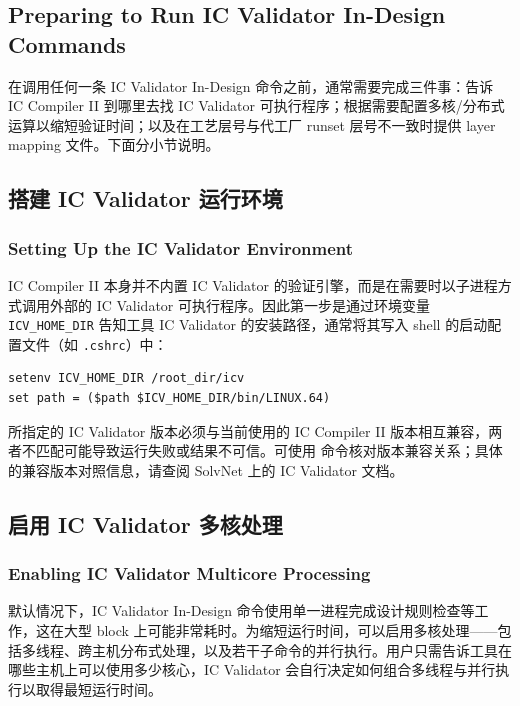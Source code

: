 \subsection*{Preparing to Run IC Validator In-Design Commands}

在调用任何一条 IC Validator In-Design 命令之前，通常需要完成三件事：告诉 IC Compiler II 到哪里去找 IC Validator 可执行程序；根据需要配置多核/分布式运算以缩短验证时间；以及在工艺层号与代工厂 runset 层号不一致时提供 layer mapping 文件。下面分小节说明。

\subsection{搭建 IC Validator 运行环境}
\subsubsection*{Setting Up the IC Validator Environment}

IC Compiler II 本身并不内置 IC Validator 的验证引擎，而是在需要时以子进程方式调用外部的 IC Validator 可执行程序。因此第一步是通过环境变量 \texttt{ICV\_HOME\_DIR} 告知工具 IC Validator 的安装路径，通常将其写入 shell 的启动配置文件（如 \texttt{.cshrc}）中：

\begin{lstlisting}
setenv ICV_HOME_DIR /root_dir/icv
set path = ($path $ICV_HOME_DIR/bin/LINUX.64)
\end{lstlisting}

\begin{noteBox}
所指定的 IC Validator 版本必须与当前使用的 IC Compiler II 版本相互兼容，两者不匹配可能导致运行失败或结果不可信。可使用  命令核对版本兼容关系；具体的兼容版本对照信息，请查阅 SolvNet 上的 IC Validator 文档。
\end{noteBox}

\subsection{启用 IC Validator 多核处理}
\subsubsection*{Enabling IC Validator Multicore Processing}

默认情况下，IC Validator In-Design 命令使用单一进程完成设计规则检查等工作，这在大型 block 上可能非常耗时。为缩短运行时间，可以启用多核处理——包括多线程、跨主机分布式处理，以及若干子命令的并行执行。用户只需告诉工具在哪些主机上可以使用多少核心，IC Validator 会自行决定如何组合多线程与并行执行以取得最短运行时间。

